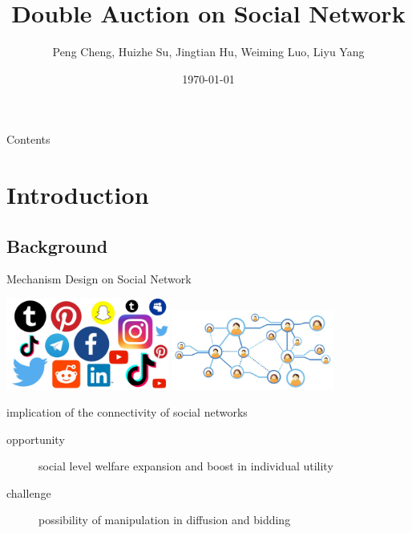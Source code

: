 \documentclass{beamer}
\title{Double Auction on Social Network}
\author{Peng Cheng, Huizhe Su, Jingtian Hu, Weiming Luo, Liyu Yang}
\date{\today}
\begin{document}
\frame{\titlepage}
\begin{frame}{Contents}
	\tableofcontents
\end{frame}

\section{Introduction}

\subsection{Background}

\begin{frame}{Mechanism Design on Social Network}
	\begin{center}
		\includegraphics[width=0.4\textwidth]{social-networks-icons}
		\includegraphics[width=0.4\textwidth]{social-network-graph}
	\end{center}

	\begin{block}{implication of the connectivity of social networks}
		\begin{description}
			\item[opportunity] social level welfare expansion and boost in individual utility
			\item[challenge] possibility of manipulation in diffusion and bidding
		\end{description}
	\end{block}
\end{frame}
\end{document}
